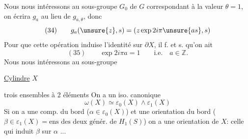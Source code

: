 
Nous nous intéressons au sous-groupe $G_0$ de $G$ correspondant à la valeur $\theta=1$, on écrira $g_a$ au lieu de $g_{a,\theta}$, donc
\[
(34)\qquad g_a(\unsure{z},s)=(z\exp2i\pi\unsure{as},s)
\]
Pour que cette opération induise l'identité sur $\partial X$, il f. et s. qu'on ait
\[
(35)\qquad\exp2i\pi a=1\qquad\text{i.e.}\quad a\in\mathbb Z.
\]
Nous nous intéressons au sous-groupe


\uline{Cylindre}\quad{} $X$

trois ensembles à 2 éléments
On a un iso. canonique
\[
\omega(X)\simeq\varepsilon_0(X)\wedge\varepsilon_1(X)
\]
Si on a une comp.  du bord ($\alpha\in\varepsilon_0(X)$) et une orientation du bord ($\beta\in\varepsilon_1(X)=\text{ens des deux génér. de }H_1(S)$) on a une orientation de $X$: celle qui induit $\beta$ sur $\alpha$ ...

